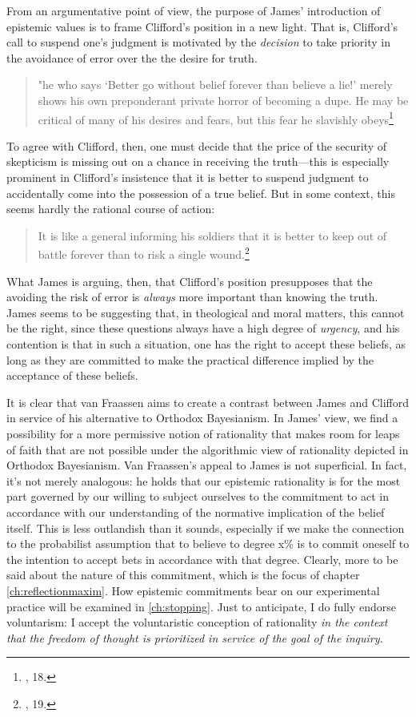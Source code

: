 From an argumentative point of view, the purpose of James' introduction
of epistemic values is to frame Clifford's position in a new light. That
is, Clifford's call to suspend one's judgment is motivated by the
\emph{decision} to take priority in the avoidance of error over the the
desire for truth.

\begin{quote}
"he who says `Better go without belief forever than believe a lie!'
merely shows his own preponderant private horror of becoming a dupe. He
may be critical of many of his desires and fears, but this fear he
slavishly obeys\footnote{\cite{jameswill}, 18.}
\end{quote}

To agree with Clifford, then, one must decide that the price of the
security of skepticism is missing out on a chance in receiving the
truth---this is especially prominent in Clifford's insistence that it is
better to suspend judgment to accidentally come into the possession of a
true belief. But in some context, this seems hardly the rational course
of action:

\begin{quote}
It is like a general informing his soldiers that it is better to keep
out of battle forever than to risk a single wound.\footnote{\cite{jameswill}, 19.}
\end{quote}

What James is arguing, then, that Clifford's position presupposes that
the avoiding the risk of error is \emph{always} more important than
knowing the truth. James seems to be suggesting that, in theological and
moral matters, this cannot be the right, since these questions always
have a high degree of \emph{urgency}, and his contention is that in such
a situation, one has the right to accept these beliefs, as long as they
are committed to make the practical difference implied by the acceptance
of these beliefs.

It is clear that van Fraassen aims to create a contrast between James
and Clifford in service of his alternative to Orthodox Bayesianism. In
James' view, we find a possibility for a more permissive notion of
rationality that makes room for leaps of faith that are not possible
under the algorithmic view of rationality depicted in Orthodox
Bayesianism. Van Fraassen's appeal to James is not superficial. In fact, it's not merely analogous: he holds that our epistemic rationality is for the most part governed by our willing to subject ourselves to the commitment to act in accordance with our understanding of the normative implication of the belief itself. This is less outlandish than it sounds, especially if we make the connection to the probabilist assumption that to believe to degree x\% is to commit oneself to the intention to accept bets in accordance with that degree.  Clearly, more to be said about the nature of this commitment, which is the focus of chapter \ref{ch:reflectionmaxim}. How epistemic commitments bear on our experimental practice will be examined in \ref{ch:stopping}. Just to anticipate, I do fully endorse voluntarism: I accept the voluntaristic conception of rationality \emph{in the context that the freedom of thought is prioritized in service of the goal of the inquiry.}  


